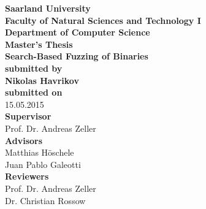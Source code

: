 \begin{titlepage}
\begin{center}
{\LARGE \bfseries Saarland University \\
Faculty of Natural Sciences and Technology I \\[0.1cm]
Department of Computer Science}\\[2.5cm]

{\Large \bfseries Master's Thesis}\\[1cm]
{\LARGE \bfseries Search-Based Fuzzing of Binaries}\\[2cm]
{\small \bfseries submitted by}\\[0.5cm]
{\large \bfseries Nikolas Havrikov}\\[1cm]
{\small \bfseries submitted on}\\
15.05.2015\\[2.5cm]
{\bfseries Supervisor}\\[0.2cm]
Prof. Dr. Andreas Zeller\\[1cm]
{\bfseries Advisors}\\[0.2cm]
Matthias Höschele\\[0.1cm]
Juan Pablo Galeotti\\[1cm]
{\bfseries Reviewers}\\[0.2cm]
Prof. Dr. Andreas Zeller\\[0.1cm]
Dr. Christian Rossow
\end{center}
\end{titlepage}
